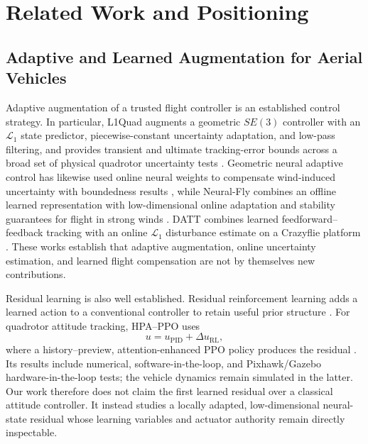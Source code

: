 
\section{Related Work and Positioning}
\label{sec:related_work}

\subsection{Adaptive and Learned Augmentation for Aerial Vehicles}

Adaptive augmentation of a trusted flight controller is an established control
strategy.  In particular, L1Quad augments a geometric $SE(3)$ controller with an
$\mathcal{L}_{1}$ state predictor, piecewise-constant uncertainty adaptation, and
low-pass filtering, and provides transient and ultimate tracking-error bounds
across a broad set of physical quadrotor uncertainty tests
\cite{wu2025l1quad}.  Geometric neural adaptive control has likewise used
online neural weights to compensate wind-induced uncertainty with boundedness
results \cite{bisheban2021geometric}, while Neural-Fly combines an offline learned
representation with low-dimensional online adaptation and stability guarantees
for flight in strong winds \cite{oconnell2022neuralfly}.  DATT combines learned
feedforward--feedback tracking with an online $\mathcal{L}_{1}$ disturbance
estimate on a Crazyflie platform \cite{huang2023datt}.  These works establish
that adaptive augmentation, online uncertainty estimation, and learned flight
compensation are not by themselves new contributions.

Residual learning is also well established.  Residual reinforcement learning
adds a learned action to a conventional controller to retain useful prior
structure \cite{johannink2019residual}.  For quadrotor attitude tracking,
HPA--PPO uses
\begin{equation}
  u = u_{\mathrm{PID}} + \Delta u_{\mathrm{RL}},
\end{equation}
where a history--preview, attention-enhanced PPO policy produces the residual
\cite{li2027hpappo}.  Its results include numerical, software-in-the-loop, and
Pixhawk/Gazebo hardware-in-the-loop tests; the vehicle dynamics remain simulated
in the latter.  Our work therefore does not claim the first learned residual
over a classical attitude controller.  It instead studies a locally adapted,
low-dimensional neural-state residual whose learning variables and actuator
authority remain directly inspectable.

